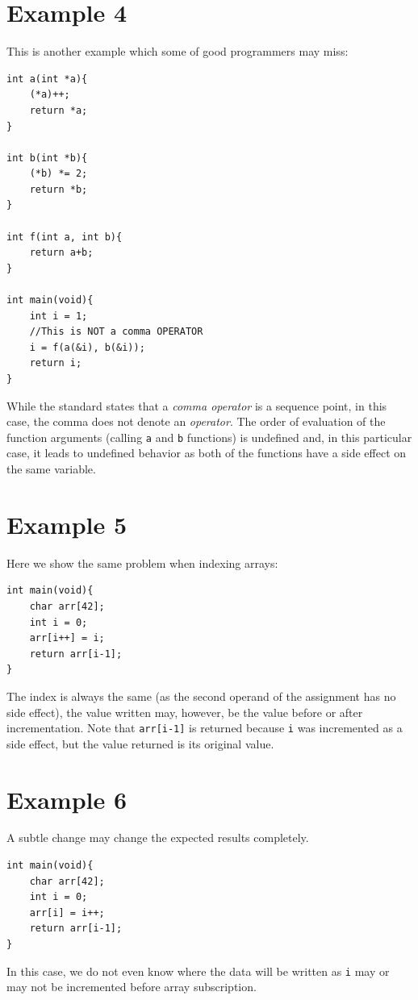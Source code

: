 \section{Example 4}\label{example4}
This is another example which some of good programmers may miss:
\begin{lstlisting}
int a(int *a){
    (*a)++;
    return *a;
}

int b(int *b){
    (*b) *= 2;
    return *b;
}

int f(int a, int b){
    return a+b;
}

int main(void){
    int i = 1;
    //This is NOT a comma OPERATOR
    i = f(a(&i), b(&i));
    return i;
}
\end{lstlisting}
While the standard states that a \emph{comma operator} is a sequence point, in this case, the comma does not denote an \emph{operator}. The order of evaluation of the function arguments (calling \verb|a| and \verb|b| functions) is undefined and, in this particular case, it leads to undefined behavior as both of the functions have a side effect on the same variable.

\section{Example 5}\label{example5}
Here we show the same problem when indexing arrays:
\begin{lstlisting}
int main(void){
    char arr[42];
    int i = 0;
    arr[i++] = i;
    return arr[i-1];
}
\end{lstlisting}
The index is always the same (as the second operand of the assignment has no side effect), the value written may, however, be the value before or after incrementation. Note that \verb|arr[i-1]| is returned because \verb|i| was incremented as a side effect, but the value returned is its original value.

\section{Example 6}\label{example6}
A subtle change may change the expected results completely.
\begin{lstlisting}
int main(void){
    char arr[42];
    int i = 0;
    arr[i] = i++;
    return arr[i-1];
}
\end{lstlisting}
In this case, we do not even know where the data will be written as \verb|i| may or may not be incremented before array subscription.

